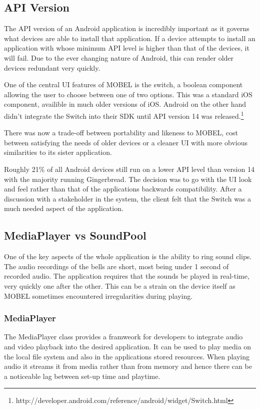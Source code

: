 \documentclass{l4proj}
\begin{document}
\subsection{API Version}
The API version of an Android application is incredibly important as it governs what devices are able to install that application.  If a device  attempts to install an application with whose minimum API level is higher than that of the devices, it will fail.  Due to the ever changing nature of Android, this can render older devices redundant very quickly.

One of the central UI features of MOBEL is the switch, a boolean component allowing the user to choose between one of two options.  This was a standard iOS component, availible in much older versions of iOS.  Android on the other hand didn't integrate the Switch into their SDK until API version 14 was released.\footnote{http://developer.android.com/reference/android/widget/Switch.html} 

There was now a trade-off between portability and likeness to MOBEL, cost between satisfying the needs of older devices or a cleaner UI with more obvious similarities to its sister application.  

Roughly 21\% of all Android devices still run on a lower API level than version 14 with the majority running Gingerbread. The decision was to go with the UI look and feel rather than that of the applications backwards compatibility.  After a discussion with a stakeholder in the system, the client felt that the Switch was a much needed aspect of the application.

\subsection{MediaPlayer vs SoundPool}
One of the key aspects of the whole application is the ability to ring sound clips. The audio recordings of the bells are short, most being under 1 second of recorded audio.  The application requires that the sounds be played in real-time, very quickly one after the other.  This can be a strain on the device itself as MOBEL sometimes encountered irregularities during playing.

\subsubsection{MediaPlayer} The MediaPlayer class provides a framweork for developers to integrate audio and video playback into the desired application.  It can be used to play media on the local file system and also in the applications stored resources.  When playing audio it streams it from media rather than from memory and hence there can be a noticeable lag between set-up time and playtime.    
\end{document}
